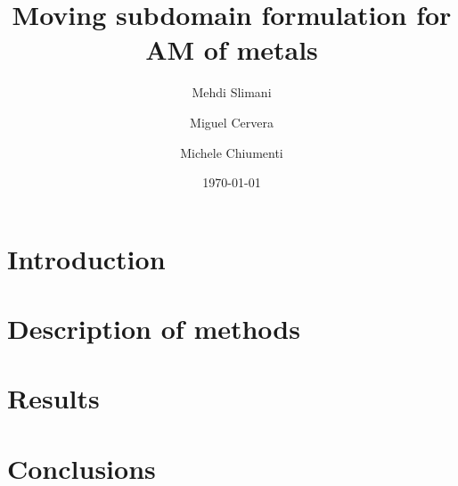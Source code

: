 \documentclass{elsarticle}
\title{Moving subdomain formulation for AM of metals}
\author[1]{Mehdi Slimani}
\author[1]{Miguel Cervera}
\author[1]{Michele Chiumenti}
\affiliation[1]{organization={CIMNE}}
\date{\today}
\begin{document}
\begin{abstract}
  
\end{abstract}

\maketitle

\section{Introduction}\label{sec:intro}


\section{Description of methods}\label{sec:methodman}


\section{Results}\label{sec:results}


\section{Conclusions}\label{sec:conclusions}




\end{document}
